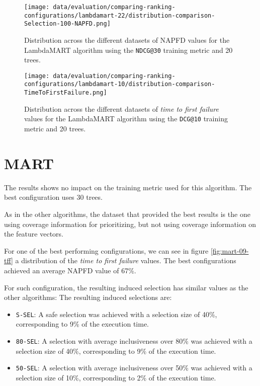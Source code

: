 \begin{figure}
    \centering
    \begin{minipage}{.45\textwidth}
        \centering
        \label{fig:lambdamart-22-napfd}
        \texttt{[image: data/evaluation/comparing-ranking-configurations/lambdamart-22/distribution-comparison-Selection-100-NAPFD.png]}
        \parbox{0.9\textwidth}{\caption{Distribution across the different datasets of NAPFD values for the LambdaMART algorithm using the \texttt{NDCG@30} training metric and 20 trees.}}
    \end{minipage}%
    \begin{minipage}{.45\textwidth}
        \centering
        \label{fig:lambdamart-10-tff}
        \texttt{[image: data/evaluation/comparing-ranking-configurations/lambdamart-10/distribution-comparison-TimeToFirstFailure.png]}
        \parbox{0.9\textwidth}{\caption{Distribution across the different datasets of \emph{time to first failure} values for the LambdaMART algorithm using the \texttt{DCG@10} training metric and 20 trees.}}
    \end{minipage}%
\end{figure}

\section{MART}
The results shows no impact on the training metric used for this algorithm. The best configuration uses 30 trees.

As in the other algorithms, the dataset that provided the best results is the one using coverage information for prioritizing, but
not using coverage information on the feature vectors.

For one of the best performing configurations, we can see in figure \ref{fig:mart-09-tff} a distribution of
the \emph{time to first failure} values. The best configurations achieved an average NAPFD value of 67\%.

For such configuration, the resulting induced selection has similar values as the other algorithms:
The resulting induced selections are:
\begin{itemize}
    \item \texttt{S-SEL}: A safe selection was achieved with a selection size of 40\%, corresponding to 9\% of the execution time.
    \item \texttt{80-SEL}: A selection with average inclusiveness over 80\% was achieved with a selection size of 40\%, corresponding to 9\% of the execution time.
    \item \texttt{50-SEL}: A selection with average inclusiveness over 50\% was achieved with a selection size of 10\%, corresponding to 2\% of the execution time.
\end{itemize}

